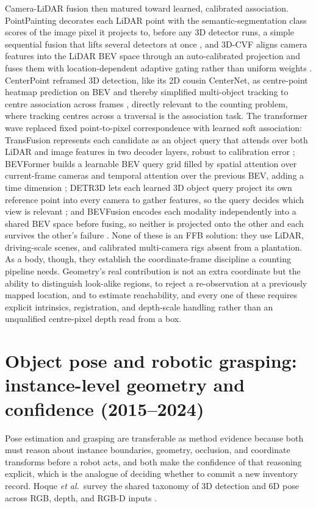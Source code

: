 Camera-LiDAR fusion then matured toward learned, calibrated association. PointPainting decorates each LiDAR point with the semantic-segmentation class scores of the image pixel it projects to, before any 3D detector runs, a simple sequential fusion that lifts several detectors at once \cite{vora2020pointpainting}, and 3D-CVF aligns camera features into the LiDAR BEV space through an auto-calibrated projection and fuses them with location-dependent adaptive gating rather than uniform weights \cite{yoo20203dcvf}. CenterPoint reframed 3D detection, like its 2D cousin CenterNet, as centre-point heatmap prediction on BEV and thereby simplified multi-object tracking to centre association across frames \cite{yin2021centerpoint}, directly relevant to the counting problem, where tracking centres across a traversal is the association task. The transformer wave replaced fixed point-to-pixel correspondence with learned soft association: TransFusion represents each candidate as an object query that attends over both LiDAR and image features in two decoder layers, robust to calibration error \cite{bai2022transfusion}; BEVFormer builds a learnable BEV query grid filled by spatial attention over current-frame cameras and temporal attention over the previous BEV, adding a time dimension \cite{li2022bevformer}; DETR3D lets each learned 3D object query project its own reference point into every camera to gather features, so the query decides which view is relevant \cite{wang2022detr3d}; and BEVFusion encodes each modality independently into a shared BEV space before fusing, so neither is projected onto the other and each survives the other's failure \cite{liu2023bevfusion}. None of these is an FFB solution: they use LiDAR, driving-scale scenes, and calibrated multi-camera rigs absent from a plantation. As a body, though, they establish the coordinate-frame discipline a counting pipeline needs. Geometry's real contribution is not an extra coordinate but the ability to distinguish look-alike regions, to reject a re-observation at a previously mapped location, and to estimate reachability, and every one of these requires explicit intrinsics, registration, and depth-scale handling rather than an unqualified centre-pixel depth read from a box.

\section{Object pose and robotic grasping: instance-level geometry and confidence (2015--2024)}

Pose estimation and grasping are transferable as method evidence because both must reason about instance boundaries, geometry, occlusion, and coordinate transforms before a robot acts, and both make the confidence of that reasoning explicit, which is the analogue of deciding whether to commit a new inventory record. Hoque \textit{et al.}\ survey the shared taxonomy of 3D detection and 6D pose across RGB, depth, and RGB-D inputs \cite{hoque2021posesurvey}.

